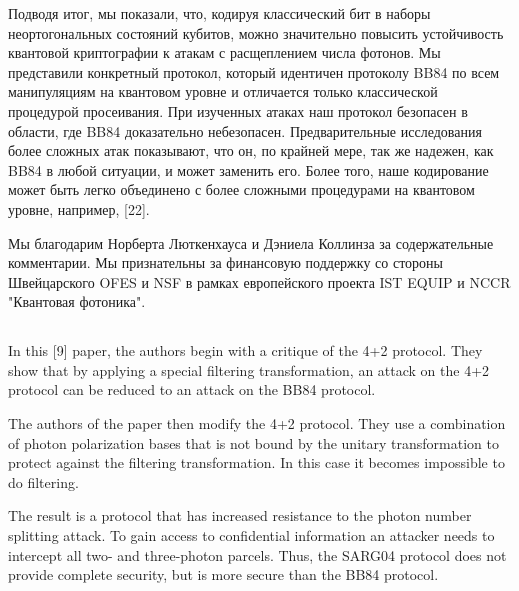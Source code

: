 Подводя итог, мы показали, что, кодируя классический бит в наборы неортогональных состояний кубитов, можно значительно повысить устойчивость квантовой криптографии к атакам с расщеплением числа фотонов. Мы представили конкретный протокол, который идентичен протоколу BB84 по всем манипуляциям на квантовом уровне и отличается только классической процедурой просеивания. При изученных атаках наш протокол безопасен в области, где BB84 доказательно небезопасен. Предварительные исследования более сложных атак показывают, что он, по крайней мере, так же надежен, как BB84 в любой ситуации, и может заменить его. Более того, наше кодирование может быть легко объединено с более сложными процедурами на квантовом уровне, например, [22].

Мы благодарим Норберта Люткенхауса и Дэниела Коллинза за содержательные комментарии. Мы признательны за финансовую поддержку со стороны Швейцарского OFES и NSF в рамках европейского проекта IST EQUIP и NCCR "Квантовая фотоника".
\subsection{\review}
In this [9] paper, the authors begin with a critique of the 4+2 protocol. They show that by applying a special filtering transformation, an attack on the 4+2 protocol can be reduced to an attack on the BB84 protocol.

The authors of the paper then modify the 4+2 protocol. They use a combination of photon polarization bases that is not bound by the unitary transformation to protect against the filtering transformation. In this case it becomes impossible to do filtering.

The result is a protocol that has increased resistance to the photon number splitting attack. To gain access to confidential information an attacker needs to intercept all two- and three-photon parcels. Thus, the SARG04 protocol does not provide complete security, but is more secure than the BB84 protocol.


\subsection{\dic}
